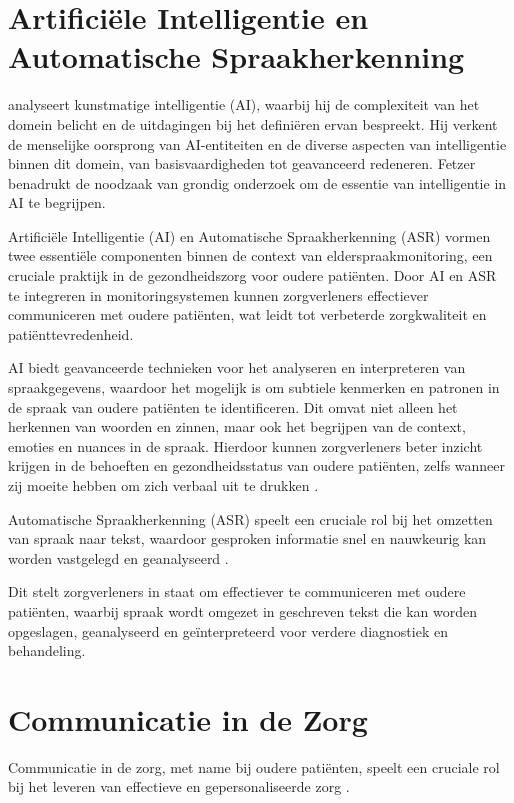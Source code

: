 \section{Artificiële Intelligentie en Automatische Spraakherkenning}

\textcite{Fetzer_1990} analyseert kunstmatige intelligentie (AI), waarbij hij de complexiteit van het domein belicht en de uitdagingen bij het definiëren ervan bespreekt. Hij verkent de menselijke oorsprong van AI-entiteiten en de diverse aspecten van intelligentie binnen dit domein, van basisvaardigheden tot geavanceerd redeneren. Fetzer benadrukt de noodzaak van grondig onderzoek om de essentie van intelligentie in AI te begrijpen.

Artificiële Intelligentie (AI) en Automatische Spraakherkenning (ASR) vormen twee essentiële componenten binnen de context van elderspraakmonitoring, een cruciale praktijk in de gezondheidszorg voor oudere patiënten. Door AI en ASR te integreren in monitoringsystemen kunnen zorgverleners effectiever communiceren met oudere patiënten, wat leidt tot verbeterde zorgkwaliteit en patiënttevredenheid.

AI biedt geavanceerde technieken voor het analyseren en interpreteren van spraakgegevens, waardoor het mogelijk is om subtiele kenmerken en patronen in de spraak van oudere patiënten te identificeren. Dit omvat niet alleen het herkennen van woorden en zinnen, maar ook het begrijpen van de context, emoties en nuances in de spraak. Hierdoor kunnen zorgverleners beter inzicht krijgen in de behoeften en gezondheidsstatus van oudere patiënten, zelfs wanneer zij moeite hebben om zich verbaal uit te drukken \autocite{young2002,jabraf2019}.

Automatische Spraakherkenning (ASR) speelt een cruciale rol bij het omzetten van spraak naar tekst, waardoor gesproken informatie snel en nauwkeurig kan worden vastgelegd en geanalyseerd \autocite{rabiner1993fundamentals,jabraf2017}.

Dit stelt zorgverleners in staat om effectiever te communiceren met oudere patiënten, waarbij spraak wordt omgezet in geschreven tekst die kan worden opgeslagen, geanalyseerd en geïnterpreteerd voor verdere diagnostiek en behandeling.

\section{Communicatie in de Zorg}
Communicatie in de zorg, met name bij oudere patiënten, speelt een cruciale rol bij het leveren van effectieve en gepersonaliseerde zorg \autocite{smith2020}.

